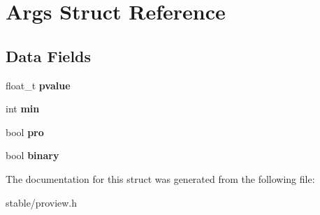 \hypertarget{structArgs}{\section{Args Struct Reference}
\label{structArgs}
}
\subsection*{Data Fields}
\begin{DoxyCompactItemize}
\item 
\hypertarget{structArgs_a384a1e1af35681f8adac0bebd571d372}{float\-\_\-t {\bfseries pvalue}}\label{structArgs_a384a1e1af35681f8adac0bebd571d372}

\item 
\hypertarget{structArgs_aa631808b16629f4cc4ca7f34f89b3d54}{int {\bfseries min}}\label{structArgs_aa631808b16629f4cc4ca7f34f89b3d54}

\item 
\hypertarget{structArgs_a825d174b8accceddff970b7c1594f36c}{bool {\bfseries pro}}\label{structArgs_a825d174b8accceddff970b7c1594f36c}

\item 
\hypertarget{structArgs_a244a8043a10a91b647ceb08a3d6fef9f}{bool {\bfseries binary}}\label{structArgs_a244a8043a10a91b647ceb08a3d6fef9f}

\end{DoxyCompactItemize}


The documentation for this struct was generated from the following file\-:\begin{DoxyCompactItemize}
\item 
stable/proview.\-h\end{DoxyCompactItemize}
